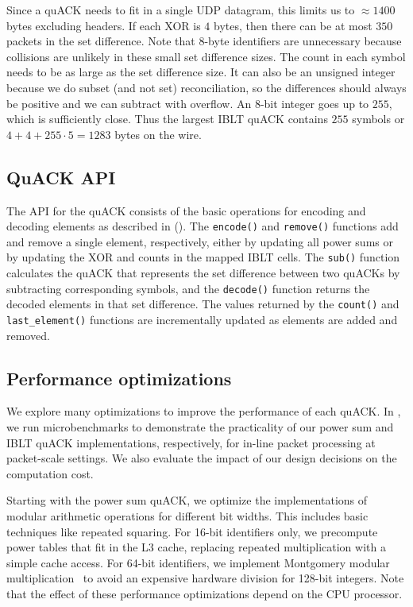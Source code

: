 Since a quACK needs to fit in a single UDP datagram, this limits us to
$\approx\!1400$ bytes excluding headers. If each XOR is $4$ bytes, then there
can be at most $350$ packets in the set difference. Note that $8$-byte
identifiers are unnecessary because collisions are unlikely in these small set
difference sizes. The count in each symbol needs to be as large as the set
difference size. It can also be an unsigned integer because we do subset
(and not set) reconciliation, so the differences should always be positive
and we can subtract with overflow. An 8-bit
integer goes up to $255$, which is sufficiently close. Thus the largest IBLT
quACK contains $255$ symbols or $4 + 4 + 255 \cdot 5 = 1283$ bytes on the wire.

\subsection{QuACK API}
\label{sec:quack:implementation:api}

The API for the quACK consists of the basic operations for encoding and
decoding elements as described in 
(). The
\texttt{encode()} and \texttt{remove()} functions add and remove a single
element, respectively, either by updating all power sums or by updating the XOR
and counts in the mapped IBLT cells. The \texttt{sub()} function calculates the
quACK that represents the set difference between two quACKs by subtracting
corresponding symbols, and the \texttt{decode()} function returns the decoded
elements in that set difference. The values returned by the
\texttt{count()} and \texttt{last\_element()} functions are incrementally
updated as elements are added and removed.

\subsection{Performance optimizations}
\label{sec:quack:implementation:optimizations}

We explore many optimizations to improve the performance of each quACK.
In , we run
microbenchmarks to demonstrate the practicality of our power sum and IBLT quACK
implementations, respectively, for in-line packet processing at packet-scale
settings. We also evaluate the impact of our design decisions on the computation
cost.

Starting with the power sum quACK, we optimize the implementations of modular
arithmetic operations for different bit widths. This includes basic techniques
like repeated squaring. For 16-bit identifiers only, we precompute power tables
that fit in the L3 cache, replacing repeated multiplication with a simple cache
access. For 64-bit identifiers, we implement Montgomery modular
multiplication~\cite{montgomery1985modular} to avoid an expensive hardware
division for 128-bit integers. Note that the effect of these performance
optimizations depend on the CPU processor.

